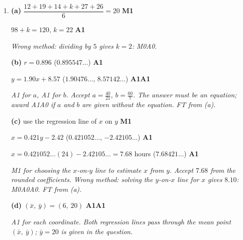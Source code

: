\documentclass[12pt, twoside]{article}
\begin{document}
\begin{enumerate}[itemsep=0.3cm]
\textbf{(d)} $2A\hat{B}C = 2\pi - 1.4 - 2.33774\ldots$ \hfill \textbf{M1}

$A\hat{B}C = 1.27$ \quad ($1.27271\ldots$) \hfill \textbf{A1}

\emph{M1 for the angle sum $2\pi$ with $A\hat{B}C = A\hat{D}C$ by symmetry,
or for any other valid method (e.g.\ $A\hat{B}D + D\hat{B}C$). Wrong
method: $A\hat{B}D = \frac{\pi - 1.4}{2} = 0.871$ alone: M0A0. $72.9^\circ$
earns M1A0. FT from (b).}

\newpage

\item[2.] [Maximum mark: 10]

\textbf{(a)} $\dfrac{12 + 19 + 14 + k + 27 + 26}{6} = 20$ \hfill \textbf{M1}

$98 + k = 120$, \quad $k = 22$ \hfill \textbf{A1}

\emph{Wrong method: dividing by $5$ gives $k = 2$: M0A0.}

\textbf{(b)} $r = 0.896$ \quad ($0.895547\ldots$) \hfill \textbf{A1}

$y = 1.90x + 8.57$ \quad ($1.90476\ldots$, $8.57142\ldots$) \hfill \textbf{A1A1}

\emph{A1 for $a$, A1 for $b$. Accept $a = \frac{40}{21}$, $b = \frac{60}{7}$.
The answer must be an equation; award A1A0 if $a$ and $b$ are given
without the equation. FT from (a).}

\textbf{(c)} use the regression line of $x$ on $y$ \hfill \textbf{M1}

$x = 0.421y - 2.42$ \quad ($0.421052\ldots$, $-2.42105\ldots$) \hfill \textbf{A1}

$x = 0.421052\ldots(24) - 2.42105\ldots = 7.68$ hours \quad ($7.68421\ldots$) \hfill \textbf{A1}

\emph{M1 for choosing the $x$-on-$y$ line to estimate $x$ from $y$. Accept
$7.68$ from the rounded coefficients. Wrong method: solving the $y$-on-$x$
line for $x$ gives $8.10$: M0A0A0. FT from (a).}

\textbf{(d)} $(\bar{x},\ \bar{y}) = (6,\ 20)$ \hfill \textbf{A1A1}

\emph{A1 for each coordinate. Both regression lines pass through the mean
point $(\bar{x},\ \bar{y})$; $\bar{y} = 20$ is given in the question.}

\end{enumerate}
\end{document}

